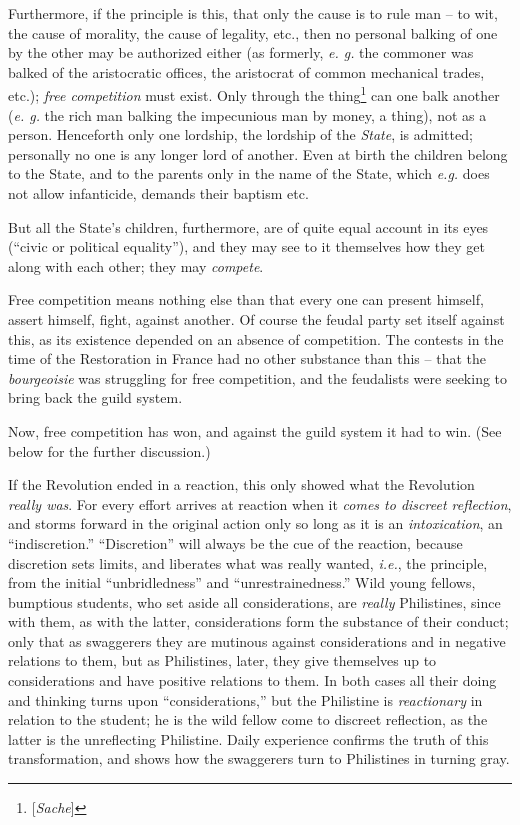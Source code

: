 \documentclass[12pt,a4paper]{book}
\begin{document}
Furthermore, if the principle is this, that only the cause is to rule man -- 
to wit, the cause of morality, the cause of legality, etc., then no personal 
balking of one by the other may be authorized either (as formerly, \textit{e. 
g.} the commoner was balked of the aristocratic offices, the aristocrat of 
common mechanical trades, etc.); \textit{free competition} must exist. Only 
through the thing\footnote{[\textit{Sache}]} can one balk another (\textit{e. 
g.} the rich man balking the impecunious man by money, a thing), not as a 
person. Henceforth only one lordship, the lordship of the \textit{State}, is 
admitted; personally no one is any longer lord of another. Even at birth the 
children belong to the State, and to the parents only in the name of the 
State, which \textit{e.g.} does not allow infanticide, demands their baptism 
etc.

But all the State's children, furthermore, are of quite equal account in its 
eyes (``civic or political equality''), and they may see to it themselves 
how they get along with each other; they may \textit{compete}.

Free competition means nothing else than that every one can present himself, 
assert himself, fight, against another. Of course the feudal party set itself 
against this, as its existence depended on an absence of competition. The 
contests in the time of the Restoration in France had no other substance than 
this -- that the \textit{bourgeoisie} was struggling for free competition, and 
the feudalists were seeking to bring back the guild system.

Now, free competition has won, and against the guild system it had to win. 
(See below for the further discussion.)

If the Revolution ended in a reaction, this only showed what the Revolution 
\textit{really was}. For every effort arrives at reaction when it 
\textit{comes to discreet reflection}, and storms forward in the original 
action only so long as it is an \textit{intoxication}, an ``indiscretion.'' 
``Discretion'' will always be the cue of the reaction, because discretion 
sets limits, and liberates what was really wanted, \textit{i.e.}, the 
principle, from the initial ``unbridledness'' and ``unrestrainedness.'' 
Wild young fellows, bumptious students, who set aside all considerations, are 
\textit{really} Philistines, since with them, as with the latter, 
considerations form the substance of their conduct; only that as swaggerers 
they are mutinous against considerations and in negative relations to them, 
but as Philistines, later, they give themselves up to considerations and have 
positive relations to them. In both cases all their doing and thinking turns 
upon ``considerations,'' but the Philistine is \textit{reactionary} in 
relation to the student; he is the wild fellow come to discreet reflection, as 
the latter is the unreflecting Philistine. Daily experience confirms the truth 
of this transformation, and shows how the swaggerers turn to Philistines in 
turning gray.
\end{document}
